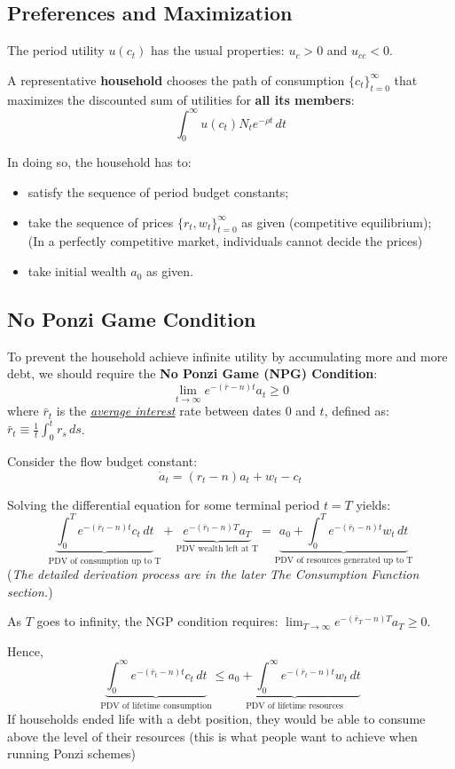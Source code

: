 \subsection{Preferences and Maximization} The period utility $u(c_t)$ has the usual properties: $u_c > 0$ and $u_{cc} < 0$.

A representative \textbf{household} chooses the path of consumption $\{c_t\}_{t=0}^{\infty }$ that maximizes the discounted sum of utilities for \textbf{all its members}: \[
    \int_{0}^{\infty } u(c_t)N_te^{-\rho t} \, dt
\]

In doing so, the household has to: \begin{itemize}
    \item satisfy the sequence of period budget constants;
    \item take the sequence of prices $\{r_t,w_t\}_{t=0}^{\infty }$ as given (competitive equilibrium); \\ (In a perfectly competitive market, individuals cannot decide the prices)
    \item take initial wealth $a_0$ as given.
\end{itemize}

\subsection{No Ponzi Game Condition}

To prevent the household achieve infinite utility by accumulating more and more debt, we should require the \textbf{No Ponzi Game (NPG) Condition}: \[
    \lim_{t \to \infty} e^{-(\bar{r}-n)t}a_t \geq 0
\] where $\bar{r}_t$ is the \underline{\textit{average interest}} rate between dates $0$ and $t$, defined as: $\bar{r}_t \equiv \frac{1}{t}\int_{0}^{t} r_s \, ds$.

\begin{remark*}
    Consider the flow budget constant: \[
        \dot{a}_t = (r_t - n)a_t + w_t - c_t
    \]

    Solving the differential equation for some terminal period $t=T$ yields: \[
        \underbrace{\int_{0}^{T} e^{-(\bar{r}_t-n)t}c_t \, dt}_{\text{PDV of consumption up to T}} + \underbrace{e^{-(\bar{r}_t-n)T}a_T}_{\text{PDV wealth left at T}} = \underbrace{a_0 + \int_{0}^{T} e^{-(\bar{r}_t-n)t}w_t \, dt}_{\text{PDV of resources generated up to T}}
    \]
    (\textit{The detailed derivation process are in the later The Consumption Function section.})

    As $T$ goes to infinity, the NGP condition requires: $\lim_{T \to \infty} e^{-(\bar{r}_T - n)T}a_T \geq 0$.

    Hence, \[
        \underbrace{\int_{0}^{\infty } e^{-(\bar{r}_t-n)t}c_t \, dt}_{\text{PDV of lifetime consumption}} \leq \underbrace{a_0 + \int_{0}^{\infty } e^{-(\bar{r}_t-n)t}w_t \, dt}_{\text{PDV of lifetime resources}}
    \]
    If households ended life with a debt position, they would be able to consume above the level of their resources (this is what people want to achieve when running Ponzi schemes)
\end{remark*}

